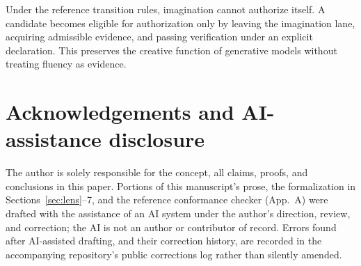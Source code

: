 \documentclass[10pt,twocolumn]{article}
\begin{document}
Under the reference transition rules, imagination cannot authorize itself. A candidate becomes eligible for authorization only by leaving the imagination lane, acquiring admissible evidence, and passing verification under an explicit declaration. This preserves the creative function of generative models without treating fluency as evidence.

\section*{Acknowledgements and AI-assistance disclosure}
The author is solely responsible for the concept, all claims, proofs, and conclusions in this paper. Portions of this manuscript's prose, the formalization in Sections~\ref{sec:lens}--7, and the reference conformance checker (App.~A) were drafted with the assistance of an AI system under the author's direction, review, and correction; the AI is not an author or contributor of record. Errors found after AI-assisted drafting, and their correction history, are recorded in the accompanying repository's public corrections log rather than silently amended.
\end{document}
